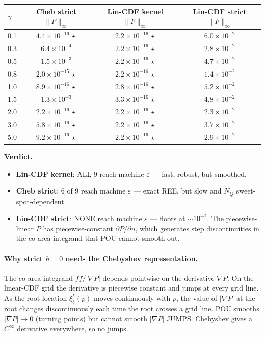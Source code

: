 \documentclass[11pt]{article}
\begin{document}
\begin{center}
\begin{tabular}{lccc}
\toprule
$\gamma$ & Cheb strict $\|F\|_\infty$ & Lin-CDF kernel $\|F\|_\infty$ & Lin-CDF strict $\|F\|_\infty$ \\
\midrule
0.1 & $4.4\!\times\!10^{-16}\,\star$ & $2.2\!\times\!10^{-16}\,\star$ & $6.0\!\times\!10^{-2}$ \\
0.3 & $6.4\!\times\!10^{-4}$         & $2.2\!\times\!10^{-16}\,\star$ & $2.8\!\times\!10^{-2}$ \\
0.5 & $1.5\!\times\!10^{-3}$         & $2.2\!\times\!10^{-16}\,\star$ & $4.7\!\times\!10^{-2}$ \\
0.8 & $2.0\!\times\!10^{-15}\,\star$ & $2.2\!\times\!10^{-16}\,\star$ & $1.4\!\times\!10^{-2}$ \\
1.0 & $8.9\!\times\!10^{-16}\,\star$ & $2.8\!\times\!10^{-16}\,\star$ & $5.2\!\times\!10^{-2}$ \\
1.5 & $1.3\!\times\!10^{-3}$         & $3.3\!\times\!10^{-16}\,\star$ & $4.8\!\times\!10^{-2}$ \\
2.0 & $2.2\!\times\!10^{-16}\,\star$ & $2.2\!\times\!10^{-16}\,\star$ & $2.3\!\times\!10^{-2}$ \\
3.0 & $5.8\!\times\!10^{-16}\,\star$ & $2.2\!\times\!10^{-16}\,\star$ & $3.7\!\times\!10^{-2}$ \\
5.0 & $9.2\!\times\!10^{-16}\,\star$ & $2.2\!\times\!10^{-16}\,\star$ & $2.9\!\times\!10^{-2}$ \\
\bottomrule
\end{tabular}
\end{center}

\textbf{Verdict.}
\begin{itemize}
  \item \textbf{Lin-CDF kernel}: ALL 9 reach machine $\varepsilon$ — fast, robust,
        but smoothed.
  \item \textbf{Cheb strict}: 6 of 9 reach machine $\varepsilon$ — exact REE, but
        slow and $N_Q$ sweet-spot-dependent.
  \item \textbf{Lin-CDF strict}: NONE reach machine $\varepsilon$ — floors at
        $\sim 10^{-2}$. The piecewise-linear $P$ has piecewise-constant
        $\partial P/\partial u$, which generates step discontinuities in the
        co-area integrand that POU cannot smooth out.
\end{itemize}

\paragraph{Why strict $h{=}0$ needs the Chebyshev representation.}
The co-area integrand $f f / |\nabla P|$ depends pointwise on the derivative
$\nabla P$. On the linear-CDF grid the derivative is piecewise constant and
jumps at every grid line. As the root location $\xi_b^*(p)$ moves continuously
with $p$, the value of $|\nabla P|$ at the root changes discontinuously
each time the root crosses a grid line. POU smooths $|\nabla P| \to 0$
(turning points) but cannot smooth $|\nabla P|$ JUMPS. Chebyshev gives a
$C^\infty$ derivative everywhere, so no jumps.
\end{document}
